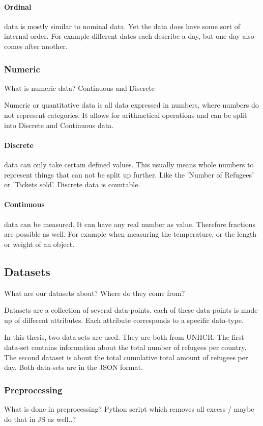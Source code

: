 \paragraph{Ordinal}
data is mostly similar to nominal data. Yet the data does have some sort of internal order. For example different dates each describe a day, but one day also comes after another.

\subsubsection{Numeric}
What is numeric data? Continuous and Discrete

Numeric or quantitative data is all data expressed in numbers, where numbers do not represent categories. It allows for arithmetical operations and can be split into Discrete and Continuous data.

\paragraph{Discrete}
data can only take certain defined values. This usually means whole numbers to represent things that can not be split up further. Like the 'Number of Refugees' or 'Tickets sold'. Discrete data is countable.

\paragraph{Continuous}
data can be measured. It can have any real number as value. Therefore fractions are possible as well. For example when measuring the temperature, or the length or weight of an object.

\subsection{Datasets}
What are our datasets about? Where do they come from?

Datasets are a collection of several data-points. each of these data-points is made up of different attributes. Each attribute corresponds to a specific data-type.

In this thesis, two data-sets are used. They are both from UNHCR\cite{unhcr}. The first data-set contains information about the total number of refugees per country\cite{unhcr_rpc}. The second dataset is about the total cumulative total amount of refugees per day\cite{unhcr_rpd}. Both data-sets are in the JSON format.

\subsubsection{Preprocessing}
What is done in preprocessing? Python script which removes all excess / maybe do that in JS as well..?

